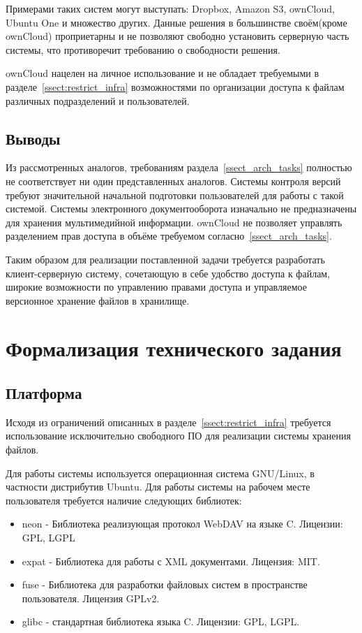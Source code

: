 \documentclass[utf8,usehyperref,12pt]{G7-32}
\begin{document}
Примерами таких систем могут выступать: Dropbox, Amazon S3, ownCloud, Ubuntu One и множество других. Данные решения в большинстве своём(кроме ownCloud) проприетарны и не позволяют свободно установить серверную часть системы, что противоречит требованию о свободности решения.

ownCloud нацелен на личное использование и не обладает требуемыми в разделе~\ref{ssect:restrict_infra} возможностями по организации доступа к файлам различных подразделений и пользователей.

\subsection{Выводы}

Из рассмотренных аналогов, требованиям раздела~\ref{ssect_arch_tasks} полностью не соответствует ни один представленных аналогов. Системы контроля версий требуют значительной начальной подготовки пользователей для работы с такой системой. Системы электронного документооборота изначально не предназначены для хранения мультимедийной информации. ownCloud не позволяет управлять разделением прав доступа в объёме требуемом согласно~\ref{ssect_arch_tasks}.

Таким образом для реализации поставленной задачи требуется разработать клиент-серверную систему, сочетающую в себе удобство доступа к файлам, широкие возможности по управлению правами доступа и управляемое версионное хранение файлов в хранилище.

\section{Формализация технического задания}\label{sect:formal_req}
\subsection{Платформа}\label{ssect:platform}
Исходя из ограничений описанных в разделе~\ref{ssect:restrict_infra} требуется использование исключительно свободного ПО для реализации системы хранения файлов. 

Для работы системы используется операционная система GNU/Linux, в частности дистрибутив Ubuntu. Для работы системы на рабочем месте пользователя требуется наличие следующих библиотек:

\begin{itemize}
 \item neon\cite{neon} - Библиотека реализующая протокол WebDAV\cite{webdav_wiki}\cite{webdav_rfc} на языке C. Лицензии: GPL, LGPL
 \item expat - Библиотека для работы с XML документами. Лицензия: MIT.
 \item fuse - Библиотека для разработки файловых систем в пространстве пользователя\cite{fuse}\cite{fuse_wiki}. Лицензия GPLv2.
 \item glibc - стандартная библиотека языка C. Лицензии: GPL, LGPL.
\end{itemize}
\end{document}
